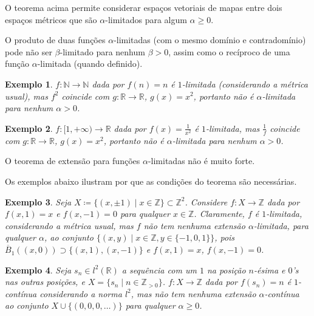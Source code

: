 \documentclass[a4paper,12pt]{article}
\newtheorem{example}{Exemplo}
\theoremstyle{definition}
\begin{document}
O teorema acima permite considerar espaços vetoriais de mapas entre dois espaços métricos que são $\alpha$-limitados para algum $\alpha \ge 0$.

O produto de duas funções $\alpha$-limitadas (com o mesmo domínio e contradomínio) pode não ser $\beta$-limitado para nenhum $\beta > 0$, assim como o recíproco de uma função $\alpha$-limitada (quando definido).

\begin{example} $f : \mathbb{N} \to \mathbb{N}$ dada por $f(n) = n$ é $1$-limitada (considerando a métrica usual), mas $f^2$ coincide com $g : \mathbb{R} \to \mathbb{R}$, $g(x) = x^2$, portanto não é $\alpha$-limitada para nenhum $\alpha > 0$. \end{example}

\begin{example} $f : [1, +\infty) \to \mathbb{R}$ dada por $f(x) = \frac{1}{x^2}$ é $1$-limitada, mas $\frac{1}{f}$ coincide com $g : \mathbb{R} \to \mathbb{R}$, $g(x) = x^2$, portanto não é $\alpha$-limitada para nenhum $\alpha > 0$. \end{example}

O teorema de extensão para funções $\alpha$-limitadas não é muito forte.

Os exemplos abaixo ilustram por que as condições do teorema são necessárias.

\begin{example} Seja $X \coloneqq \{(x, \pm 1) \mid x \in \mathbb{Z}\} \subset \mathbb{Z}^2$. Considere $f : X \to \mathbb{Z}$ dada por $f(x, 1) = x$ e $f(x, -1) = 0$ para qualquer $x \in \mathbb{Z}$. Claramente, $f$ é $1$-limitada, considerando a métrica usual, mas $f$ não tem nenhuma extensão $\alpha$-limitada, para qualquer $\alpha$, ao conjunto $\{(x, y) \mid x \in \mathbb{Z}, y \in \{-1,0,1\}\}$, pois $\overline{B}_1((x, 0)) \supset \{ (x, 1), (x, -1) \}$ e $f(x, 1) = x$, $f(x, -1) = 0$. \end{example}



\begin{example} Seja $s_n \in l^2(\mathbb{R})$ a sequência com um $1$ na posição $n$-ésima e $0$'s nas outras posições, e $X = \{ s_n \mid n \in \mathbb{Z}_{> 0} \}$. $f : X \to \mathbb{Z}$ dada por $f(s_n) = n$ é $1$-contínua considerando a norma $l^2$, mas não tem nenhuma extensão $\alpha$-contínua ao conjunto $X \cup \{(0, 0, 0, \dots)\}$ para qualquer $\alpha \ge 0$. \end{example}
\end{document}
